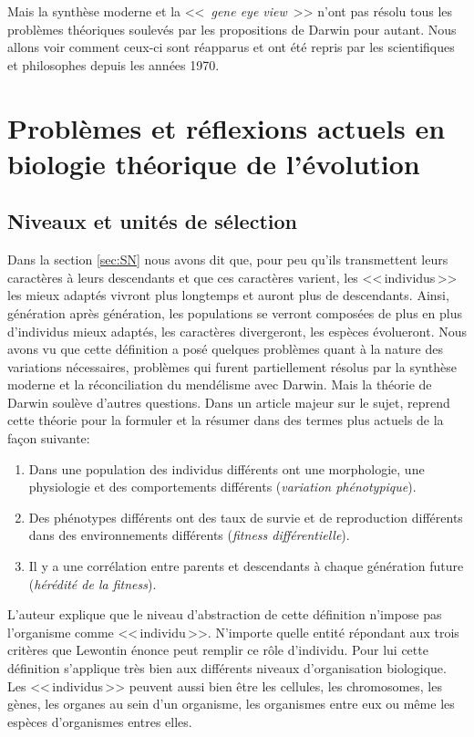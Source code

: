Mais la synthèse moderne et la <<~\emph{gene eye view}~>> n'ont pas résolu tous les problèmes théoriques soulevés par les propositions de Darwin pour autant. Nous allons voir comment ceux-ci sont réapparus et ont été repris par les scientifiques et philosophes depuis les années 1970.


\section{Problèmes et réflexions actuels en biologie théorique de l'évolution}\label{sec:pbm}
\subsection{Niveaux et unités de sélection}\label{sec:lvl}
Dans la section \ref{sec:SN} nous avons dit que, pour peu qu'ils transmettent leurs caractères à leurs descendants et que ces caractères varient, les <<\,individus\,>> les mieux adaptés vivront plus longtemps et auront plus de descendants. Ainsi, génération après génération, les populations se verront composées de plus en plus d'individus mieux adaptés, les caractères divergeront, les espèces évolueront. Nous avons vu que cette définition a posé quelques problèmes quant à la nature des variations nécessaires, problèmes qui furent partiellement résolus par la synthèse moderne et la réconciliation du mendélisme avec Darwin. Mais la théorie de Darwin soulève d'autres questions. Dans un article majeur sur le sujet, \cite{lewontin70unitsselection} reprend cette théorie pour la formuler et la résumer dans des termes plus actuels de la façon suivante:
\begin{enumerate}
	\item Dans une population des individus différents ont une morphologie, une physiologie et des comportements différents (\emph{variation phénotypique}).
\item Des phénotypes différents ont des taux de survie et de reproduction différents dans des environnements différents (\emph{fitness différentielle}).
	\item Il y a une corrélation entre parents et descendants à chaque génération future (\emph{hérédité de la fitness}).
\end{enumerate}

L'auteur explique que le niveau d'abstraction de cette définition n'impose pas l'organisme comme <<\,individu\,>>. N'importe quelle entité répondant aux trois critères que Lewontin énonce peut remplir ce rôle d'individu. Pour lui cette définition s'applique très bien aux différents niveaux d'organisation biologique. Les <<\,individus\,>> peuvent aussi bien être les cellules, les chromosomes, les gènes, les organes au sein d'un organisme, les organismes entre eux ou même les espèces d'organismes entres elles. 

